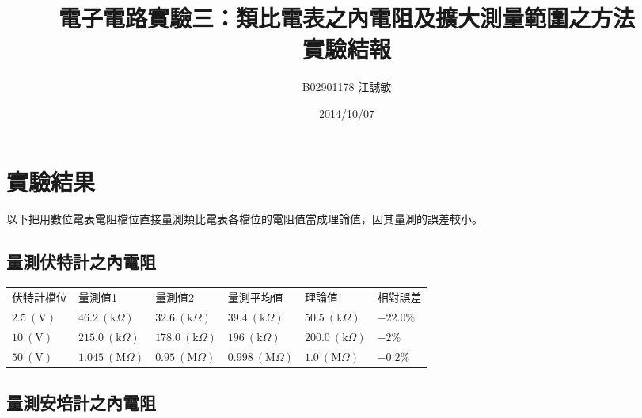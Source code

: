 \documentclass[12pt, a4paper]{article}
\title{ \bf {\Huge 電子電路實驗三：類比電表之內電阻及擴大測量範圍之方法}\\ 實驗結報}
\author{B02901178 江誠敏}
\date{2014/10/07}
\newcommand{\unit}[1]{\:(\text{#1})}
\begin{document}
\maketitle

\section{實驗結果}
以下把用數位電表電阻檔位直接量測類比電表各檔位的電阻值當成理論值，因其量測的誤差較小。
\subsection{量測伏特計之內電阻}
\begin{comment}
本實驗的電路圖如下：\\
\begin{center}
\begin{tikzpicture}[american voltages, scale=.8]
	\draw[color=black, thick]
	(0, 0) to [V] (0, 6) {}
	(0, 6) to [short] (6, 6) {}
	(6, 6) to [voltmeter] (6, 3) {}
	(6, 3) to [vR] (6, 0)
	(6, 3) to [short] (3, 3)
	(3, 3) to [cspst, /tikz/circuitikz/bipoles/length=2.5cm] (3, 0)
	(6, 0) to [short] (0, 0)
	(3, 0) node[ground]{}
	;
\end{tikzpicture}
\end{center}
\end{comment}


\begin{center}
	\begin{tabular}{p{2.5cm}p{2cm}p{2cm}p{2.5cm}p{2.5cm}p{2cm}}
	\hline
	伏特計檔位 & 量測值1 & 量測值2 & 量測平均值 & 理論值 & 相對誤差 \\
	\hhline{======}
	$2.5\unit{V}$ & $46.2 \:(\text{k}\Omega)$ & $32.6 \:(\text{k}\Omega)$ & $39.4 \:(\text{k}\Omega)$ & $50.5 \:(\text{k}\Omega) $ & $-22.0\%$ \\
	\hline
	$10\unit{V}$ & $215.0 \:(\text{k}\Omega)$ & $178.0 \:(\text{k}\Omega)$ & $196 \:(\text{k}\Omega)$ & $200.0 \:(\text{k}\Omega) $ & $-2\%$ \\
	\hline
	$50\unit{V}$ & $1.045 \:(\text{M}\Omega)$ & $0.95 \:(\text{M}\Omega)$ & $0.998 \:(\text{M}\Omega)$ & $1.0 \:(\text{M}\Omega) $ & $-0.2\%$ \\
	\hline
\end{tabular}
\end{center}

\subsection{量測安培計之內電阻}
\end{document}
